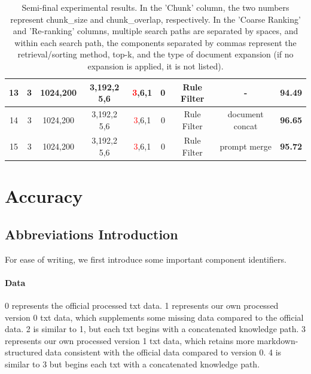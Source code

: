 \documentclass[11pt]{article}
\def\retrievaltextcircled#1{\large{\textcircled{\small{\color{blue}#1}}}\normalsize}
\def\reranktextcircled#1{\large{\textcircled{\small{\textcolor{red}{#1}}}}\normalsize}
\def\datatextcircled#1{\large{\textcircled{\small{#1}}}\normalsize}
\def\fusiontextcircled#1{\large{\textcircled{\small{\color{green}#1}}}\normalsize}
\def\doctextcircled#1{\large{\textcircled{\small{\color{purple}#1}}}\normalsize}
\begin{document}
\begin{table}[ht]
\begin{tabular}{ccccccccc}
13 & \datatextcircled{3} & 1024,200 & \retrievaltextcircled{3},192,\doctextcircled{2} \retrievaltextcircled{5},6&\reranktextcircled{3},6,\doctextcircled{1} & \fusiontextcircled{0} & Rule Filter & -  & \textbf{94.49} \\
\midrule
14 & \datatextcircled{3} & 1024,200 & \retrievaltextcircled{3},192,\doctextcircled{2} \retrievaltextcircled{5},6&\reranktextcircled{3},6,\doctextcircled{1} & \fusiontextcircled{0}& Rule Filter & document concat  & \textbf{96.65} \\
15 & \datatextcircled{3} & 1024,200 & \retrievaltextcircled{3},192,\doctextcircled{2} \retrievaltextcircled{5},6&\reranktextcircled{3},6,\doctextcircled{1} & \fusiontextcircled{0}& Rule Filter & prompt merge  & \textbf{95.72} \\
\bottomrule
\end{tabular}
\caption{Semi-final experimental results. In the 'Chunk' column, the two numbers represent chunk\_size and chunk\_overlap, respectively. In the 'Coarse Ranking' and 'Re-ranking' columns, multiple search paths are separated by spaces, and within each search path, the components separated by commas represent the retrieval/sorting method, top-k, and the type of document expansion (if no expansion is applied, it is not listed).}
 \label{tab:main_res2}

\end{table}

\section{Accuracy}

\subsection{Abbreviations Introduction}
For ease of writing, we first introduce some important component identifiers.

\paragraph{Data} \datatextcircled{0} represents the official processed txt data. \datatextcircled{1} represents our own processed version 0 txt data, which supplements some missing data compared to the official data. \datatextcircled{2} is similar to \datatextcircled{1}, but each txt begins with a concatenated knowledge path. \datatextcircled{3} represents our own processed version 1 txt data, which retains more markdown-structured data consistent with the official data compared to version 0. \datatextcircled{4} is similar to \datatextcircled{3} but begins each txt with a concatenated knowledge path.
\end{document}
